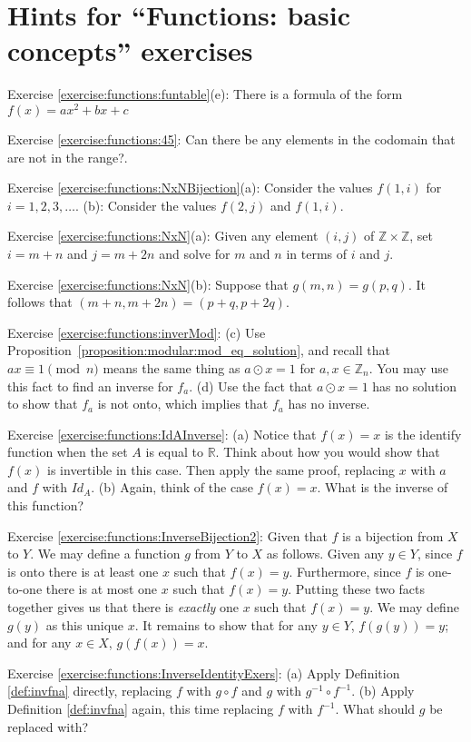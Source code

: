 \section{Hints for ``Functions: basic concepts'' exercises}
\label{sec:Functions:Hints}

\noindent Exercise \ref{exercise:functions:funtable}(e): There is a formula of the form $f(x) = ax^2 + bx + c$

\noindent Exercise \ref{exercise:functions:45}: Can there be any elements in the codomain that are not in the range?.

\noindent Exercise \ref{exercise:functions:NxNBijection}(a): Consider the values $f(1,i)$  for $i=1,2,3,\ldots$. (b): Consider  the values $f(2,j)$ and $f(1,i)$.

\noindent Exercise \ref{exercise:functions:NxN}(a): Given any element $(i,j)$ of $\mathbb{Z} \times \mathbb{Z}$, set $i=m+n$ and $j=m+2n$ and solve for $m$ and $n$ in terms of $i$ and $j$.

\noindent Exercise \ref{exercise:functions:NxN}(b): Suppose that $g(m,n) = g(p,q)$. It follows that $(m + n, m + 2n) = (p + q, p + 2q)$. %

\noindent Exercise \ref{exercise:functions:inverMod}: (c) 
Use Proposition~\ref{proposition:modular:mod_eq_solution}, and recall that $ax \equiv 1 \pmod{n}$ means the same thing as $a \odot x = 1$ for $a,x \in \mathbb{Z}_n$.  You may use this fact to find an inverse for $f_a$. (d) Use the fact that $a \odot x = 1$ has no solution to  show that $f_a$ is not onto, which implies that $f_a$ has no inverse.

\noindent Exercise \ref{exercise:functions:IdAInverse}: (a) Notice that $f(x)=x$ is the identify function when the set $A$ is equal to $\mathbb{R}$.  Think about how you would show that $f(x)$ is invertible in this case.  Then apply the same proof, replacing $x$ with $a$ and $f$ with
$Id_A$.  (b) Again, think of the case $f(x)=x$.  What is the inverse of this function? 

\noindent Exercise \ref{exercise:functions:InverseBijection2}: Given that $f$ is a bijection from $X$ to $Y$. We may define a function $g$ from $Y$ to $X$ as follows.  Given any $y \in Y$, since $f$ is onto there is at least one $x$ such that $f(x) = y$. Furthermore, since $f$ is one-to-one there is at most one $x$ such that $f(x)=y$. Putting these two facts together gives us that there is \emph{exactly} one $x$ such that $f(x)=y$.  We may define $g(y)$ as this unique $x$. It remains to show that for any $y \in Y$, $f(g(y))=y$; and for any $x \in X$, $g(f(x))=x$.

\noindent Exercise \ref{exercise:functions:InverseIdentityExers}: (a) Apply Definition  \ref{def:invfna} directly, replacing $f$ with
$g \circ f$ and $g$ with $g^{-1} \circ f^{-1}$. (b) Apply Definition  \ref{def:invfna} again, this time replacing $f$ with
$f^{-1}$. What should $g$ be replaced with?

